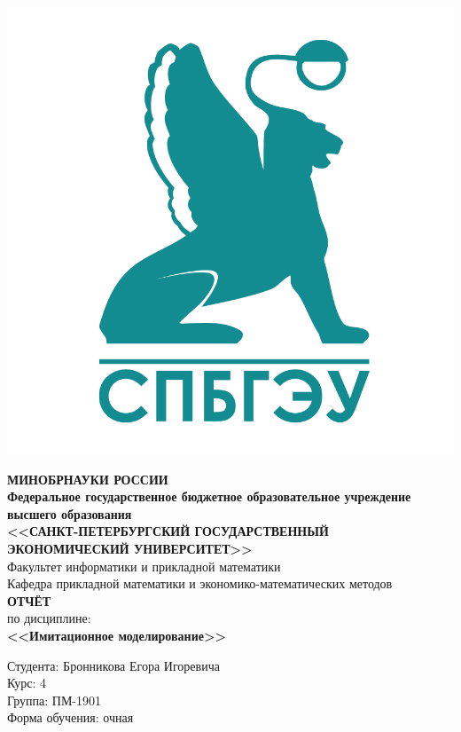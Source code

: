 \documentclass[14pt,fleqn]{extarticle}
\begin{document}
	\begin{titlepage}
		\includegraphics[scale=0.1]{logo}
		\begin{center}
			\textbf{МИНОБРНАУКИ РОССИИ}\\
			\vspace{0.2cm}
			\textbf{Федеральное государственное бюджетное образовательное учреждение высшего образования}\\
			\textbf{<<САНКТ-ПЕТЕРБУРГСКИЙ ГОСУДАРСТВЕННЫЙ ЭКОНОМИЧЕСКИЙ УНИВЕРСИТЕТ>>}\\
			\vspace{0.6cm}
			Факультет информатики и прикладной математики\\
			Кафедра прикладной математики и экономико-математических методов\\
			\vspace{1cm}
			\textbf{ОТЧЁТ}\\
			по дисциплине:\\
			\textbf{<<Имитационное моделирование>>}\\
		\end{center}
		\vspace{1cm}
		Студента: Бронникова Егора Игоревича\\
		Курс: 4\\
		Группа: ПМ-1901\\
		Форма обучения: очная\\

\end{titlepage}
\end{document}
